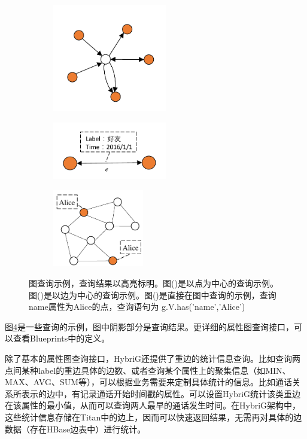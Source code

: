 \begin{figure}
\begin{subfigure}[b]{.3\linewidth}
\centering
\includegraphics[width=50mm]{fig/graph_query1.pdf}
\label{fig:query_a}
\end{subfigure}
\begin{subfigure}[b]{.3\linewidth}
\centering
\includegraphics[width=50mm]{fig/graph_query2.pdf}
\label{fig:query_b}
\end{subfigure}
\begin{subfigure}[b]{.3\linewidth}
\centering
\includegraphics[width=40mm]{fig/graph_query3.pdf}
\label{fig:query_c}
\end{subfigure}
\caption[图查询示例]{图查询示例，查询结果以高亮标明。图()是以点为中心的查询示例。图()是以边为中心的查询示例。图()是直接在图中查询的示例，查询name属性为Alice的点，查询语句为 g.V.has('name','Alice')}\label{fig:graph_queries}
\end{figure}


图\ref{fig:graph_queries}是一些查询的示例，图中阴影部分是查询结果。更详细的属性图查询接口，可以查看Blueprints中的定义。



除了基本的属性图查询接口，HybriG还提供了重边的统计信息查询。比如查询两点间某种label的重边具体的边数、或者查询某个属性上的聚集信息（如MIN、MAX、AVG、SUM等），可以根据业务需要来定制具体统计的信息。比如通话关系所表示的边中，有记录通话开始时间戳的属性。可以设置HybriG统计该类重边在该属性的最小值，从而可以查询两人最早的通话发生时间。在HybriG架构中，这些统计信息存储在Titan中的边上，因而可以快速返回结果，无需再对具体的边数据（存在HBase边表中）进行统计。

